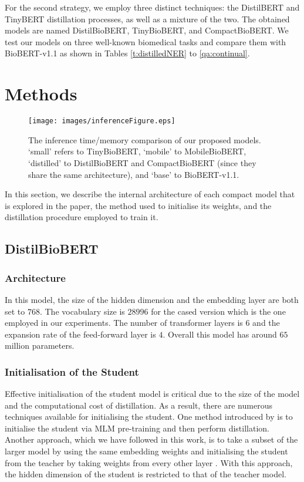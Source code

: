 \documentclass{article}
\begin{document}
For the second strategy, we employ three distinct techniques: the DistilBERT and TinyBERT distillation processes, as well as a mixture of the two. The obtained models  are named DistilBioBERT, TinyBioBERT, and CompactBioBERT. We test our models on three well-known biomedical tasks and compare them with BioBERT-v1.1 as shown in Tables \ref{t:distilledNER} to \ref{qa:continual}.

\section{Methods}

\begin{figure*}[ht!]
\centering
\label{fig:efficieny}
\texttt{[image: images/inferenceFigure.eps]}
\caption{The inference time/memory comparison of our proposed models. `small' refers to TinyBioBERT, `mobile' to MobileBioBERT, `distilled' to DistilBioBERT and CompactBioBERT (since they share the same architecture), and `base' to BioBERT-v1.1.}
\end{figure*}

In this section, we describe the internal architecture of each compact model that is explored in the paper, the method used to initialise its weights, and the distillation procedure employed to train it.  



\subsection{DistilBioBERT}
\label{distilbiobert}

\subsubsection{Architecture}
In this model, the size of the hidden dimension and the embedding layer are both set to $768$. The vocabulary size is $28996$ for the cased version which is the one employed in our experiments. The number of transformer layers is $6$ and the expansion rate of the feed-forward layer is $4$. Overall this model has around $65$ million parameters.

\subsubsection{Initialisation of the Student}
Effective initialisation of the student model is critical due to the size of the model and the computational cost of distillation.
As a result, there are numerous techniques available for initialising the student. One method introduced by \citet{distillation_google} is to initialise the student via MLM pre-training and then perform distillation. Another approach, which we have followed in this work, is to take a subset of the larger model by using the same embedding weights and initialising the student from the teacher by taking weights from every other layer \citep{sanh2019distilbert}. With this approach, the hidden dimension of the student is restricted to that of the teacher model.  
\end{document}
